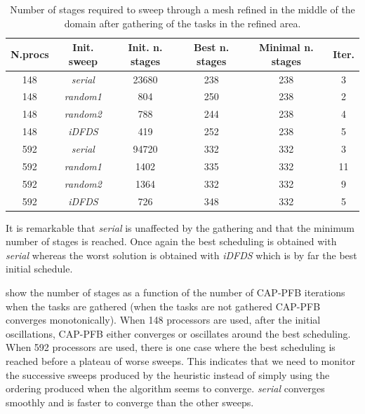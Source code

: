 \documentclass{mc2015}
\renewcommand{\(}{\left(}
\renewcommand{\)}{\right)}
\renewcommand{\[}{\left[}
\renewcommand{\]}{\right]}
\begin{document}
\begin{table}[H]
  \begin{center}
    \caption{Number of stages required to sweep through a mesh refined in the
      middle of the domain after gathering of the tasks in the refined area.}
    \begin{tabular}{|c|c|c|c|c|c|}
      \hline
      N.procs & Init. sweep & Init. n. stages & Best n. stages & Minimal n. stages & Iter. \\
      \hline
      148 &  \emph{serial} & 23680 & 238 & 238 &  3 \\
      148 & \emph{random1} &   804 & 250 & 238 &  2 \\
      148 & \emph{random2} &   788 & 244 & 238 &  4 \\
      148 &   \emph{iDFDS} &   419 & 252 & 238 &  5 \\
      592 &  \emph{serial} & 94720 & 332 & 332 &  3 \\
      592 & \emph{random1} &  1402 & 335 & 332 & 11 \\
      592 & \emph{random2} &  1364 & 332 & 332 &  9 \\
      592 &   \emph{iDFDS} &   726 & 348 & 332 &  5 \\
      \hline
    \end{tabular}
    \label{amr_2}
  \end{center}
\end{table}

It is remarkable that \emph{serial} is unaffected by the gathering and that the
minimum number of stages is reached. Once again the best scheduling is obtained
with \emph{serial} whereas the worst solution is obtained with \emph{iDFDS}
which is by far the best initial schedule.

 show the number of stages
as a function of the number of CAP-PFB iterations when the tasks are gathered (when the
tasks are not gathered CAP-PFB converges monotonically). When 148 processors are
used, after the initial oscillations, CAP-PFB either converges or oscillates
around the best scheduling. When 592 processors are used, there is one case
where the best scheduling is reached before a plateau of worse sweeps. This
indicates that we need to monitor the successive sweeps produced by the
heuristic instead of simply using the ordering produced when the algorithm seems
to converge. \emph{serial} converges smoothly and is faster to converge than the
other sweeps.
\end{document}
